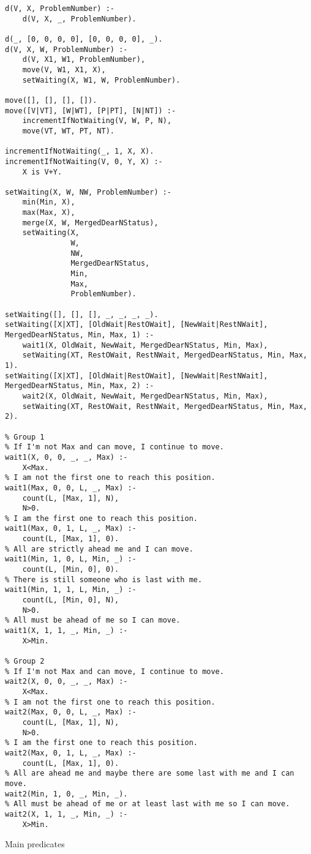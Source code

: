 \documentclass{article}
\newenvironment{longlisting}{\captionsetup{type=listing}}{}
\begin{document}
\renewcommand{\figurename}{Listing}
  \begin{longlisting}
  \begin{verbatim}
d(V, X, ProblemNumber) :-
    d(V, X, _, ProblemNumber).

d(_, [0, 0, 0, 0], [0, 0, 0, 0], _).
d(V, X, W, ProblemNumber) :-
    d(V, X1, W1, ProblemNumber),
    move(V, W1, X1, X),
    setWaiting(X, W1, W, ProblemNumber).

move([], [], [], []).
move([V|VT], [W|WT], [P|PT], [N|NT]) :-
    incrementIfNotWaiting(V, W, P, N),
    move(VT, WT, PT, NT).

incrementIfNotWaiting(_, 1, X, X).
incrementIfNotWaiting(V, 0, Y, X) :-
    X is V+Y.

setWaiting(X, W, NW, ProblemNumber) :-
    min(Min, X),
    max(Max, X),
    merge(X, W, MergedDearNStatus),
    setWaiting(X,
               W,
               NW,
               MergedDearNStatus,
               Min,
               Max,
               ProblemNumber).

setWaiting([], [], [], _, _, _, _).
setWaiting([X|XT], [OldWait|RestOWait], [NewWait|RestNWait], MergedDearNStatus, Min, Max, 1) :-
    wait1(X, OldWait, NewWait, MergedDearNStatus, Min, Max),
    setWaiting(XT, RestOWait, RestNWait, MergedDearNStatus, Min, Max, 1).
setWaiting([X|XT], [OldWait|RestOWait], [NewWait|RestNWait], MergedDearNStatus, Min, Max, 2) :-
    wait2(X, OldWait, NewWait, MergedDearNStatus, Min, Max),
    setWaiting(XT, RestOWait, RestNWait, MergedDearNStatus, Min, Max, 2).
    
% Group 1
% If I'm not Max and can move, I continue to move.
wait1(X, 0, 0, _, _, Max) :-
    X<Max. 
% I am not the first one to reach this position.
wait1(Max, 0, 0, L, _, Max) :-
    count(L, [Max, 1], N),
    N>0. 
% I am the first one to reach this position.
wait1(Max, 0, 1, L, _, Max) :-
    count(L, [Max, 1], 0). 
% All are strictly ahead me and I can move.
wait1(Min, 1, 0, L, Min, _) :-
    count(L, [Min, 0], 0).
% There is still someone who is last with me.
wait1(Min, 1, 1, L, Min, _) :-
    count(L, [Min, 0], N),
    N>0.
% All must be ahead of me so I can move.
wait1(X, 1, 1, _, Min, _) :-
    X>Min. 

% Group 2
% If I'm not Max and can move, I continue to move.
wait2(X, 0, 0, _, _, Max) :-
    X<Max.  
% I am not the first one to reach this position.
wait2(Max, 0, 0, L, _, Max) :-
    count(L, [Max, 1], N),
    N>0.
% I am the first one to reach this position.
wait2(Max, 0, 1, L, _, Max) :-
    count(L, [Max, 1], 0). 
% All are ahead me and maybe there are some last with me and I can move.
wait2(Min, 1, 0, _, Min, _).  
% All must be ahead of me or at least last with me so I can move.
wait2(X, 1, 1, _, Min, _) :-
    X>Min.  
\end{verbatim}
\caption{Main predicates}
\label{lst:secondListing}
\end{longlisting}
\end{document}
